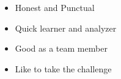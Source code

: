 

\begin{itemize}

	\item
	{Honest and Punctual}
	\item
	{Quick learner and analyzer}
	\item
	{Good as a team member}
	\item
	{Like to take the challenge}
	
\end{itemize}